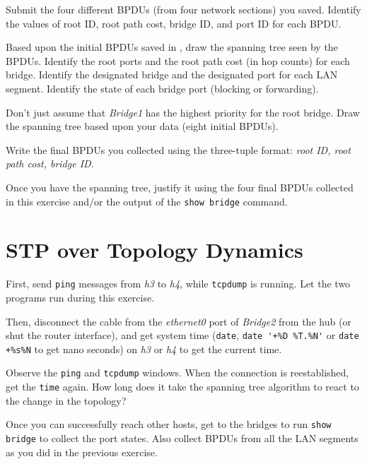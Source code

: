 \documentclass{../UTNetLab}
\begin{document}
    \begin{report}
    \item Submit the four different BPDUs (from four network sections) you saved.
    Identify the values of root ID, root path cost, bridge ID, and port ID for each BPDU.

    \item Based upon the initial BPDUs saved in , draw the spanning tree seen by the BPDUs. Identify the root ports and the root path cost (in hop counts) for each bridge.
    Identify the designated bridge and the designated port for each LAN segment.
    Identify the state of each bridge port (blocking or forwarding).

    Don’t just assume that \textit{Bridge1} has the highest priority for the root bridge.
    Draw the spanning tree based upon your data (eight initial BPDUs).

    \item Write the final BPDUs you collected using the three-tuple format: \textit{{root ID, root path cost, bridge ID}}.

    \item Once you have the spanning tree, justify it using the four final BPDUs collected in this exercise and/or the output of the \lstinline[language={cisco}]{show bridge} command.
    \end{report}


\section{STP over Topology Dynamics}
    First, send \lstinline{ping} messages from \textit{h3} to \textit{h4}, while \lstinline{tcpdump} is running.
    Let the two programs run during this exercise.

    Then, disconnect the cable from the \textit{ethernet0} port of \textit{Bridge2} from the hub (or shut the router interface), and get system time (\lstinline{date}, \lstinline{date '+%D %T.%N'} or \lstinline{date +%s%N} to get nano seconds) on \textit{h3} or \textit{h4} to get the current time.

    Observe the \lstinline{ping} and \lstinline{tcpdump} windows. When the connection is reestablished, get the \lstinline{time} again. How long does it take the spanning tree algorithm to react to the change in the topology?

    Once you can successfully reach other hosts, get to the bridges to run \lstinline[language={cisco}]{show bridge} to collect the port states. Also collect BPDUs from all the LAN segments as you did in the previous exercise.
\end{document}
